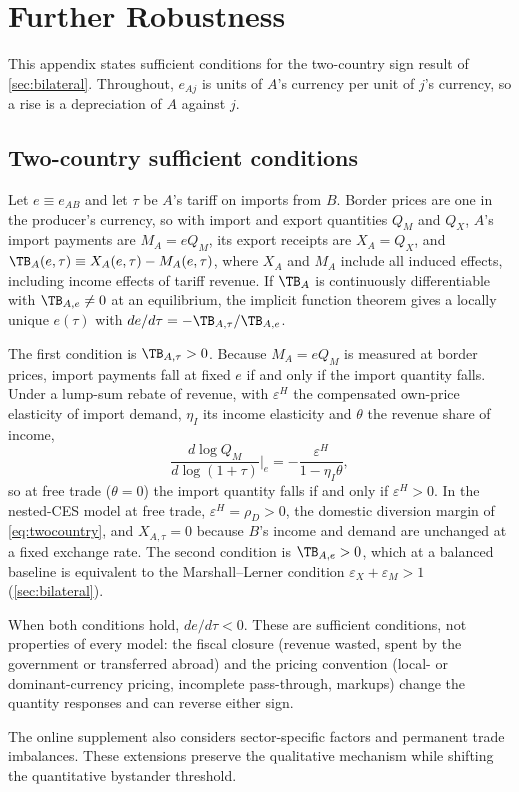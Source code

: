 \section{Further Robustness}
\label{app:online}

This appendix states sufficient conditions for the two-country sign result of \cref{sec:bilateral}. Throughout, $e_{Aj}$ is units of $A$'s currency per unit of $j$'s currency, so a rise is a depreciation of $A$ against $j$.

\subsection{Two-country sufficient conditions}
\label{app:online-twocountry}

Let $e\equiv e_{AB}$ and let $\tau$ be $A$'s tariff on imports from $B$. Border prices are one in the producer's currency, so with import and export quantities $Q_M$ and $Q_X$, $A$'s import payments are $M_A=eQ_M$, its export receipts are $X_A=Q_X$, and $\TB_A(e,\tau)\equiv X_A(e,\tau)-M_A(e,\tau)$, where $X_A$ and $M_A$ include all induced effects, including income effects of tariff revenue. If $\TB_A$ is continuously differentiable with $\TB_{A,e}\neq0$ at an equilibrium, the implicit function theorem gives a locally unique $e(\tau)$ with $de/d\tau=-\TB_{A,\tau}/\TB_{A,e}$.

The first condition is $\TB_{A,\tau}>0$. Because $M_A=eQ_M$ is measured at border prices, import payments fall at fixed $e$ if and only if the import quantity falls. Under a lump-sum rebate of revenue, with $\varepsilon^H$ the compensated own-price elasticity of import demand, $\eta_I$ its income elasticity and $\theta$ the revenue share of income,
\begin{equation*}
\frac{d\log Q_M}{d\log(1+\tau)}\bigg|_e=-\frac{\varepsilon^H}{1-\eta_I\theta},
\end{equation*}
so at free trade ($\theta=0$) the import quantity falls if and only if $\varepsilon^H>0$. In the nested-CES model at free trade, $\varepsilon^H=\rho_D>0$, the domestic diversion margin of \cref{eq:twocountry}, and $X_{A,\tau}=0$ because $B$'s income and demand are unchanged at a fixed exchange rate. The second condition is $\TB_{A,e}>0$, which at a balanced baseline is equivalent to the Marshall--Lerner condition $\varepsilon_X+\varepsilon_M>1$ (\cref{sec:bilateral}).

When both conditions hold, $de/d\tau<0$. These are sufficient conditions, not properties of every model: the fiscal closure (revenue wasted, spent by the government or transferred abroad) and the pricing convention (local- or dominant-currency pricing, incomplete pass-through, markups) change the quantity responses and can reverse either sign.

The online supplement also considers sector-specific factors and permanent trade imbalances. These extensions preserve the qualitative mechanism while shifting the quantitative bystander threshold.
